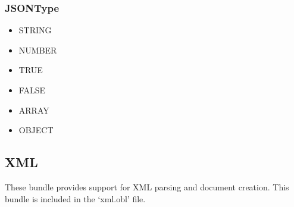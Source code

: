 \documentclass[11pt]{article}
\begin{document}
\subsubsection{JSONType}
\begin{itemize}
\item STRING
\item NUMBER
\item TRUE
\item FALSE
\item ARRAY
\item OBJECT
\end{itemize}

\subsection{XML}
These bundle provides support for XML parsing and document creation.  This bundle is included in the `xml.obl' file.
\end{document}
